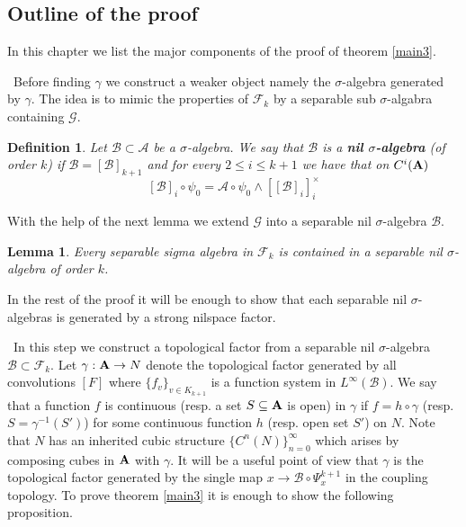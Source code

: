 \documentclass [11pt] {article}
\newtheorem{lemma}{Lemma}[section]
\newtheorem{definition}{Definition}[section]
\def\bA{{\bf A}}
\begin{document}

\bigskip

\subsection{Outline of the proof}\label{sketch}

In this chapter we list the major components of the proof of theorem \ref{main3}.

\bigskip

~Before finding $\gamma$ we construct a weaker object namely the $\sigma$-algebra generated by $\gamma$. The idea is to mimic the properties of $\mathcal{F}_k$ by a separable sub $\sigma$-algabra containing $\mathcal{G}$. 

\begin{definition} Let $\mathcal{B}\subset\mathcal{A}$ be a $\sigma$-algebra. We say that $\mathcal{B}$ is a {\bf nil $\sigma$-algebra} (of order $k$) if $\mathcal{B}=[\mathcal{B}]_{k+1}$ and for every $2\leq i\leq k+1$ we have that on $C^i(\bA)$ 
\begin{equation}\label{rhsnil}
[\mathcal{B}]_i\circ\psi_0=\mathcal{A}\circ\psi_0\wedge[[\mathcal{B}]_i]_i^\times
\end{equation}
\end{definition}

With the help of the next lemma we extend $\mathcal{G}$ into a separable nil $\sigma$-algebra $\mathcal{B}$.

\begin{lemma}\label{embednil} Every separable sigma algebra in $\mathcal{F}_k$ is contained in a separable nil $\sigma$-algebra of order $k$.
\end{lemma}

In the rest of the proof it will be enough to show that each separable nil $\sigma$-algebras is generated by a strong nilspace factor. 

\bigskip

~In this step we construct a topological factor from a separable nil $\sigma$-algebra $\mathcal{B}\subset\mathcal{F}_k$. Let $\gamma:\bA\rightarrow N$ denote the topological factor generated by all convolutions $[F]$ where $\{f_v\}_{v\in K_{k+1}}$ is a function system in $L^\infty(\mathcal{B})$. 
We say that a function $f$ is continuous (resp. a set $S\subseteq\bA$ is open) in $\gamma$ if $f=h\circ\gamma$ (resp. $S=\gamma^{-1}(S')$) for some continuous function $h$ (resp. open set $S'$) on $N$.
Note that $N$ has an inherited cubic structure $\{C^n(N)\}_{n=0}^\infty$ which arises by composing cubes in $\bA$ with $\gamma$.
It will be a useful point of view that $\gamma$ is the topological factor generated by the single map $x\rightarrow \mathcal{B}\circ\Psi^{k+1}_x$ in the coupling topology.
To prove theorem \ref{main3} it is enough to show the following proposition.
\end{document}
